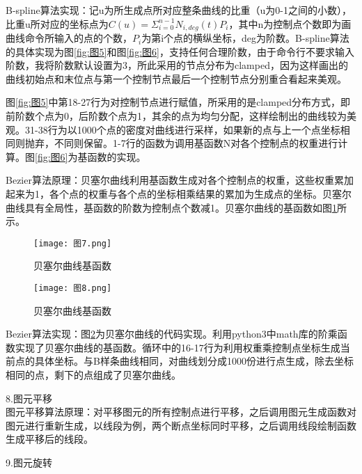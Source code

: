 \documentclass[a4paper,UTF8]{article}
\theoremstyle{definition}
\begin{document}
\indent{}B-spline算法实现：记u为所生成点所对应整条曲线的比重（u为0-1之间的小数），比重u所对应的坐标点为$C(u)=\Sigma_{i=0}^{n-1}N_{i,deg}(t)P_i$，其中n为控制点个数即为画曲线命令所输入的点的个数，$P_i$为第i个点的横纵坐标，deg为阶数。B-spline算法的具体实现为图\ref{fig:图5}和图\ref{fig:图6}，支持任何合理阶数，由于命令行不要求输入阶数，我将阶数默认设置为3，所此采用的节点分布为clamped，因为这样画出的曲线初始点和末位点与第一个控制节点最后一个控制节点分别重合看起来美观。

图\ref{fig:图5}中第18-27行为对控制节点进行赋值，所采用的是clamped分布方式，即前阶数个点为0，后阶数个点为1，其余的点为均匀分配，这样绘制出的曲线较为美观。31-38行为以1000个点的密度对曲线进行采样，如果新的点与上一个点坐标相同则抛弃，不同则保留。1-7行的函数为调用基函数N对各个控制点的权重进行计算。图\ref{fig:图6}为基函数的实现。

\indent{}Bezier算法原理：贝塞尔曲线利用基函数生成对各个控制点的权重，这些权重累加起来为1，各个点的权重与各个点的坐标相乘结果的累加为生成点的坐标。贝塞尔曲线具有全局性，基函数的阶数为控制点个数减1。贝塞尔曲线的基函数如图\ref{fig:图7}所示。

\begin{figure}[htbp]
   \centering
   \texttt{[image: 图7.png]} %
   \caption{贝塞尔曲线基函数}
   \label{fig:图7}
\end{figure}

\begin{figure}[htbp]
   \centering
   \texttt{[image: 图8.png]} %
   \caption{贝塞尔曲线基函数}
   \label{fig:图8}
\end{figure}

\indent{}Bezier算法实现：图\ref{fig:图8}为贝塞尔曲线的代码实现。利用python3中math库的阶乘函数实现了贝塞尔曲线的基函数。循环中的16-17行为利用权重乘控制点坐标生成当前点的具体坐标。与B样条曲线相同，对曲线划分成1000份进行点生成，除去坐标相同的点，剩下的点组成了贝塞尔曲线。

\noindent{}8.图元平移\\ 

\indent{}图元平移算法原理：对平移图元的所有控制点进行平移，之后调用图元生成函数对图元进行重新生成，以线段为例，两个断点坐标同时平移，之后调用线段绘制函数生成平移后的线段。

\noindent{}9.图元旋转\\
\end{document}
